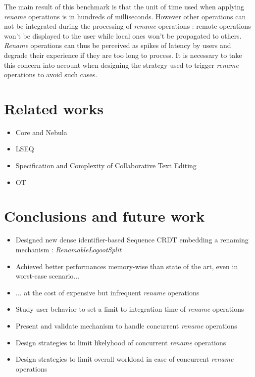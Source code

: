 \documentclass[sigplan,10pt]{acmart}
\begin{document}
The main result of this benchmark is that the unit of time used when applying \emph{rename} operations is in hundreds of milliseconds.
However other operations can not be integrated during the processing of \emph{rename} operations : remote operations won't be displayed to the user while local ones won't be propagated to others.
\emph{Rename} operations can thus be perceived as spikes of latency by users and degrade their experience if they are too long to process.
It is necessary to take this concern into account when designing the strategy used to trigger \emph{rename} operations to avoid such cases.

\section{Related works}

\begin{itemize}
    \item Core and Nebula
    \item LSEQ
    \item Specification and Complexity of Collaborative Text Editing
    \item OT
\end{itemize}

\section{Conclusions and future work}

\begin{itemize}
    \item Designed new dense identifier-based Sequence CRDT embedding a renaming mechanism : \emph{RenamableLogootSplit}
    \item Achieved better performances memory-wise than state of the art, even in worst-case scenario...
    \item ... at the cost of expensive but infrequent \emph{rename} operations
    \item Study user behavior to set a limit to integration time of \emph{rename} operations
    \item Present and validate mechanism to handle concurrent \emph{rename} operations
    \item Design strategies to limit likelyhood of concurrent \emph{rename} operations
    \item Design strategies to limit overall workload in case of concurrent \emph{rename} operations
\end{itemize}
\end{document}
